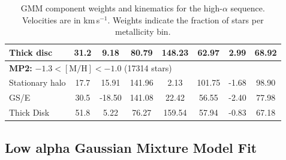 \documentclass[a4paper,12pt]{article}
\begin{document}
\begin{table}[H]
\begin{tabular}{lccccccc}
Thick disc          &   31.2 &   9.18 &  80.79 & 148.23 &  62.97 &  2.99 &  68.92 \\
\hline
\multicolumn{8}{l}{\textbf{MP2:} $-1.3 < \mathrm{[M/H]} < -1.0$ (17314 stars)} \\
Stationary halo     &  17.7 &  15.91 & 141.96 &   2.13 & 101.75 & -1.68 &  98.90 \\
GS/E                &  30.5 & -18.50 & 141.08 &  22.42 &  56.55 & -2.40 &  77.98 \\
Thick Disk          &  51.8 &   5.22 &  76.27 & 159.54 &  57.94 & -0.83 &  67.18 \\
\hline
\end{tabular}
\caption{GMM component weights and kinematics for the high-$\alpha$ sequence.  
Velocities are in km\,s$^{-1}$. Weights indicate the fraction of stars per metallicity bin.}
\label{tab:gmm_higha_stats}
\end{table}


\subsection{Low alpha Gaussian Mixture Model Fit}
\end{document}
